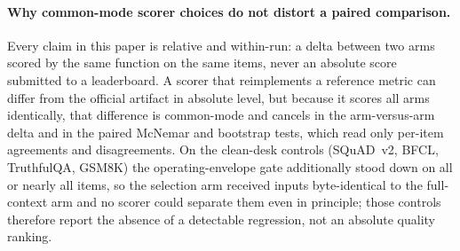\documentclass[11pt]{article}
\begin{document}
\paragraph{Why common-mode scorer choices do not distort a paired comparison.} Every claim in this
paper is relative and within-run: a delta between two arms scored by the same function on the same
items, never an absolute score submitted to a leaderboard. A scorer that reimplements a reference
metric can differ from the official artifact in absolute level, but because it scores all arms
identically, that difference is common-mode and cancels in the arm-versus-arm delta and in the
paired McNemar and bootstrap tests, which read only per-item agreements and disagreements. On the
clean-desk controls (SQuAD~v2, BFCL, TruthfulQA, GSM8K) the operating-envelope gate additionally
stood down on all or nearly all items, so the selection arm received inputs byte-identical to the
full-context arm and no scorer could separate them even in principle; those controls therefore
report the absence of a detectable regression, not an absolute quality ranking.
\end{document}
